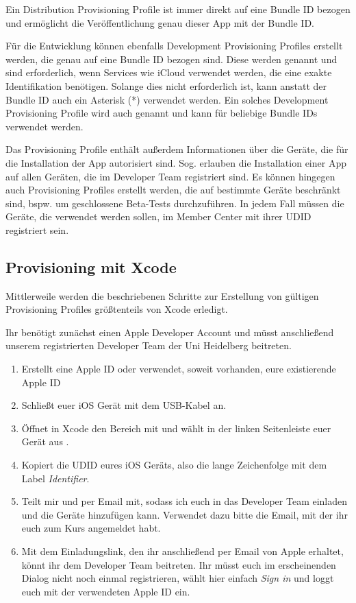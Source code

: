 \documentclass[parskip=half, final]{scrreprt}
\begin{document}
Ein Distribution Provisioning Profile ist immer direkt auf eine Bundle ID bezogen und ermöglicht die Veröffentlichung genau dieser App mit der Bundle ID.

Für die Entwicklung können ebenfalls Development Provisioning Profiles erstellt werden, die genau auf eine Bundle ID bezogen sind. Diese werden  genannt und sind erforderlich, wenn Services wie iCloud verwendet werden, die eine exakte Identifikation benötigen. Solange dies nicht erforderlich ist, kann anstatt der Bundle ID auch ein Asterisk (*) verwendet werden. Ein solches Development Provisioning Profile wird auch  genannt und kann für beliebige Bundle IDs verwendet werden.

Das Provisioning Profile enthält außerdem Informationen über die Geräte, die für die Installation der App autorisiert sind. Sog.  erlauben die Installation einer App auf allen Geräten, die im Developer Team registriert sind. Es können hingegen auch Provisioning Profiles erstellt werden, die auf bestimmte Geräte beschränkt sind, bspw. um geschlossene Beta-Tests durchzuführen. In jedem Fall müssen die Geräte, die verwendet werden sollen, im Member Center mit ihrer UDID registriert sein.
 
\subsection{Provisioning mit Xcode}\label{sec:xcodeprovisioning}

Mittlerweile werden die beschriebenen Schritte zur Erstellung von gültigen Provisioning Profiles größtenteils von Xcode erledigt.

Ihr benötigt zunächst einen Apple Developer Account und müsst anschließend unserem registrierten Developer Team der Uni Heidelberg beitreten.
\begin{enumerate}
\item Erstellt eine Apple ID  oder verwendet, soweit vorhanden, eure existierende Apple ID
\item Schließt euer iOS Gerät mit dem USB-Kabel an.
\item Öffnet in Xcode den  Bereich mit  und wählt in der linken Seitenleiste euer Gerät aus .
\item Kopiert die UDID eures iOS Geräts, also die lange Zeichenfolge mit dem Label \emph{Identifier}.
\item Teilt mir  und  per Email  mit, sodass ich euch in das Developer Team einladen und die Geräte hinzufügen kann. Verwendet dazu bitte die Email, mit der ihr euch zum Kurs angemeldet habt.
\item Mit dem Einladungslink, den ihr anschließend per Email von Apple erhaltet, könnt ihr dem Developer Team beitreten. Ihr müsst euch im erscheinenden Dialog nicht noch einmal registrieren, wählt hier einfach \emph{Sign in} und loggt euch mit der verwendeten Apple ID ein.
\end{enumerate}
\end{document}
